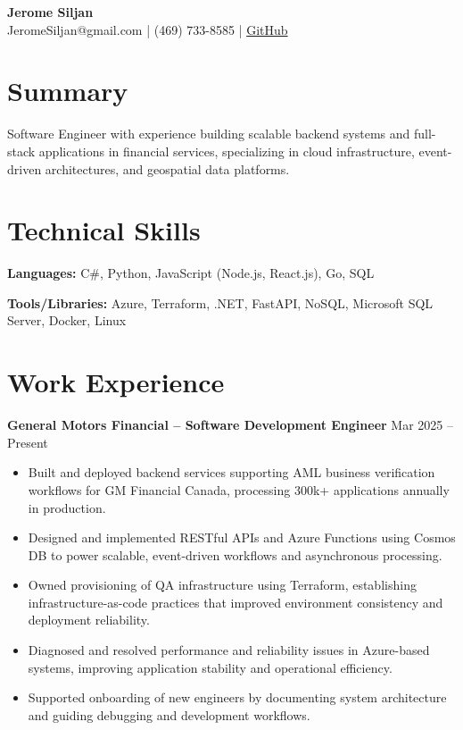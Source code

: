 \documentclass[11pt]{article}
\begin{document}
\begin{center}
    {\LARGE \textbf{Jerome Siljan}} \\
    JeromeSiljan@gmail.com \;|\; (469) 733-8585 \;|\; \href{https://github.com/JeromeSiljanUTA}{GitHub}
\end{center}

\vspace{3pt}

\section*{Summary}
Software Engineer with experience building scalable backend systems and full-stack applications in financial services, specializing in cloud infrastructure, event-driven architectures, and geospatial data platforms.

\vspace{3pt}

\section*{Technical Skills}
\textbf{Languages:} C\#, Python, JavaScript (Node.js, React.js), Go, SQL

\textbf{Tools/Libraries:} Azure, Terraform, .NET, FastAPI, NoSQL, Microsoft SQL Server, Docker, Linux

\vspace{3pt}

\section*{Work Experience}

\textbf{General Motors Financial – Software Development Engineer} \hfill Mar 2025 -- Present
\begin{itemize}
    \item Built and deployed backend services supporting AML business verification workflows for GM Financial Canada, processing 300k+ applications annually in production.
    \item Designed and implemented RESTful APIs and Azure Functions using Cosmos DB to power scalable, event-driven workflows and asynchronous processing.
    \item Owned provisioning of QA infrastructure using Terraform, establishing infrastructure-as-code practices that improved environment consistency and deployment reliability.
    \item Diagnosed and resolved performance and reliability issues in Azure-based systems, improving application stability and operational efficiency.
    \item Supported onboarding of new engineers by documenting system architecture and guiding debugging and development workflows.
\end{itemize}
\end{document}
